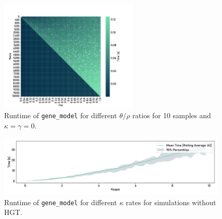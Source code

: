 \begin{figure}[H]
    \centering
    \includegraphics[width=0.6\textwidth]{figures/runtime/theta_rho_heat.pdf}
    \caption[Runtime of $\theta / \rho$ ratios.]{Runtime of \texttt{gene_model} for different $\theta / \rho$ ratios for 10 samples and $\kappa = \gamma = 0$.}
    \label{app:theta-rho-heatmap}
\end{figure}
\begin{figure}[H]
    \begin{flushright}
        \includegraphics[width=0.988\textwidth]{figures/runtime/gene_conversion_rate_large.pdf}
    \end{flushright}
    \centering
    \caption[Runtime without HGT.]{Runtime of \texttt{gene_model} for different $\kappa$ rates for simulations without HGT.}
    \label{app:runtime-ext}
\end{figure}


